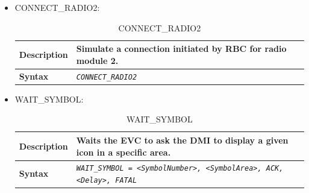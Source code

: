 \documentclass{template/openetcs}
\begin{document}
\begin{itemize}
		\item CONNECT\_RADIO2:

			\begin{longtable}{|l|l|}
				\caption{CONNECT\_RADIO2}\\ 
				\hline
				
					\begin{minipage}[t]{0.22\linewidth} \textbf{Description} \end{minipage} 
				&	\begin{minipage}[t]{0.78\linewidth} Simulate a connection initiated by RBC for radio module 2. \end{minipage} \\
				
				\hline
				
					\begin{minipage}[t]{0.22\linewidth} \textbf{Syntax}	\end{minipage}
				&	\begin{minipage}[t]{0.78\linewidth} \emph{\texttt{CONNECT\_RADIO2}} \end{minipage} \\
				
				\hline \hline
				
			\end{longtable}
			
		\item WAIT\_SYMBOL:
																
			\begin{longtable}{|l|l|}
				\caption{WAIT\_SYMBOL}\\ 
				\hline
				
					\begin{minipage}[t]{0.22\linewidth} \textbf{Description} \end{minipage} 
				&	\begin{minipage}[t]{0.78\linewidth} Waits the EVC to ask the DMI to display a given icon in a specific area. \end{minipage} \\
				
				\hline
				
					\begin{minipage}[t]{0.22\linewidth} \textbf{Syntax}	\end{minipage}
				&	\begin{minipage}[t]{0.78\linewidth} \emph{\texttt{WAIT\_SYMBOL = <SymbolNumber>, <SymbolArea>, ACK, <Delay>, FATAL}} \end{minipage} \\
				

\end{longtable}
\end{itemize}
\end{document}
